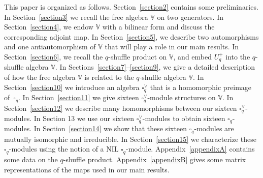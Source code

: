 \documentclass[pdftex]{sigma}
\numberwithin{equation}{section}
\begin{document}
 This paper is organized as follows.
Section~\ref{section2} contains some preliminaries. In Section~\ref{section3}
we recall the free algebra $\mathbb V$ on two generators.
In Section~\ref{section4}, we endow $\mathbb V$ with a bilinear form
and discuss the corresponding adjoint map.
In Section~\ref{section5}, we describe two automorphisms and
one antiautomorphism of $\mathbb V$ that will play a role in our main results.
In Section~\ref{section6}, we recall the $q$-shuffle product on $\mathbb V$, and
embed $U^+_q$ into the $q$-shuffle algebra $\mathbb V$.
 In Sections~\ref{section7}--\ref{section9}, we give a detailed description of
how the free algebra $\mathbb V$ is related to the
$q$-shuffle algebra $\mathbb V$.
In Section~\ref{section10} we introduce an algebra $\square^\vee_q$ that
is a homomorphic preimage of~$\square_q$. In Section~\ref{section11}
we give sixteen
$\square^\vee_q$-module structures on $\mathbb V$.
In Section~\ref{section12} we describe many homomorphisms between our
sixteen $\square^\vee_q$-modules.
In Section 13 we use our sixteen $\square^\vee_q$-modules to obtain
sixteen $\square_q$-modules.
In Section~\ref{section14} we show that these sixteen $\square_q$-modules are mutually
isomorphic and irreducible.
In Section~\ref{section15} we characterize these $\square_q$-modules
using the notion of a NIL $\square_q$-module.
Appendix~\ref{appendixA} contains some data on the $q$-shuffle product.
Appendix~\ref{appendixB} gives some matrix representations of the maps used
in our main results.
\end{document}
